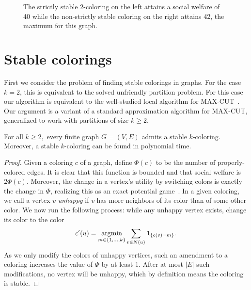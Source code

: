 \begin{figure}[t]
\centering
{}
\caption{The strictly stable 2-coloring on the left attains a social welfare of
40 while the non-strictly stable coloring on the right attains
42, the maximum for this graph.}
\label{fig:weakstrongwelfare}
\end{figure}

\section{Stable colorings}

First we consider the problem of finding stable colorings in graphs. For the
case $k=2$, this is equivalent to the solved unfriendly partition problem. For
this case our algorithm is  equivalent to the well-studied local algorithm for
MAX-CUT~\cite{ElsasserT11,MonienT10}. Our argument is a variant of a standard
approximation algorithm for MAX-CUT, generalized to work with partitions of
size $k \ge 2$.

\begin{proposition}\label{proposition:alg}
For all $k \ge 2,$ every finite graph $G=(V,E)$ admits a stable $k$-coloring.
Moreover, a stable $k$-coloring can be found in polynomial time.
\end{proposition}

\begin{proof}
Given a coloring $c$ of a graph, define $\Phi(c)$ to be the number of 
properly-colored edges. It is clear that this function is bounded and that
social welfare is $2 \Phi(c)$. Moreover, the change in a vertex's utility by
switching colors is exactly the change in $\Phi$, realizing this as an exact
potential game~\cite{M96}. In a given coloring, we call a vertex $v$
\emph{unhappy} if $v$
has more neighbors of its color than of some other color.  We now run the
following process: while any unhappy vertex exists, change its color to the
color
\begin{equation}\label{eq:greedy}
c'(u) = \operatorname*{\arg\!\min}_{m \in \{1, \ldots, k\}} \sum_{ v \in N(u)}\textbf{1}_{\left \{ c(v) = m \right \}}.
\end{equation}
As we only modify the colors of unhappy vertices, such an amendment to a
coloring increases the value of $\Phi$ by at least 1. After at most $|E|$
such modifications, no vertex will be unhappy, which by definition means the
coloring is stable.
\end{proof}

